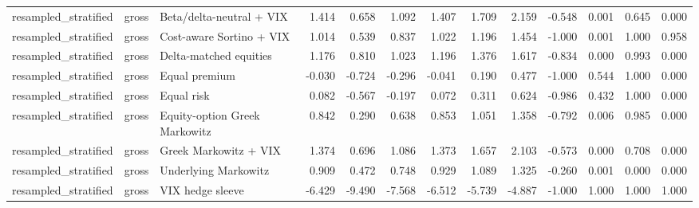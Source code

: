 \begin{tabular}{lllrrrrrrrrrr}
resampled\_stratified & gross & Beta/delta-neutral + VIX & 1.414 & 0.658 & 1.092 & 1.407 & 1.709 & 2.159 & -0.548 & 0.001 & 0.645 & 0.000 \\
resampled\_stratified & gross & Cost-aware Sortino + VIX & 1.014 & 0.539 & 0.837 & 1.022 & 1.196 & 1.454 & -1.000 & 0.001 & 1.000 & 0.958 \\
resampled\_stratified & gross & Delta-matched equities & 1.176 & 0.810 & 1.023 & 1.196 & 1.376 & 1.617 & -0.834 & 0.000 & 0.993 & 0.000 \\
resampled\_stratified & gross & Equal premium & -0.030 & -0.724 & -0.296 & -0.041 & 0.190 & 0.477 & -1.000 & 0.544 & 1.000 & 0.000 \\
resampled\_stratified & gross & Equal risk & 0.082 & -0.567 & -0.197 & 0.072 & 0.311 & 0.624 & -0.986 & 0.432 & 1.000 & 0.000 \\
resampled\_stratified & gross & Equity-option Greek Markowitz & 0.842 & 0.290 & 0.638 & 0.853 & 1.051 & 1.358 & -0.792 & 0.006 & 0.985 & 0.000 \\
resampled\_stratified & gross & Greek Markowitz + VIX & 1.374 & 0.696 & 1.086 & 1.373 & 1.657 & 2.103 & -0.573 & 0.000 & 0.708 & 0.000 \\
resampled\_stratified & gross & Underlying Markowitz & 0.909 & 0.472 & 0.748 & 0.929 & 1.089 & 1.325 & -0.260 & 0.001 & 0.000 & 0.000 \\
resampled\_stratified & gross & VIX hedge sleeve & -6.429 & -9.490 & -7.568 & -6.512 & -5.739 & -4.887 & -1.000 & 1.000 & 1.000 & 1.000 \\
\bottomrule
\end{tabular}
